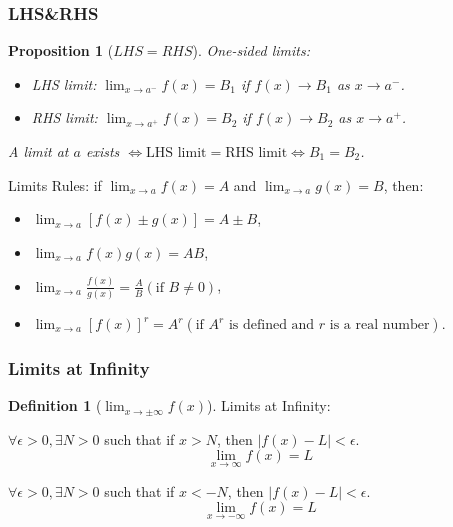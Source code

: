 \documentclass{amsart}
\newtheorem{proposition}[theorem]{Proposition}
\theoremstyle{definition}
\newtheorem{definition}[theorem]{Definition}
\theoremstyle{remark}
\numberwithin{equation}{section}
\begin{document}
\subsubsection{LHS\&RHS}

\begin{proposition}[$LHS=RHS$]
    One-sided limits:
    \begin{itemize}
        \item LHS limit: $\lim_{x \to a^-} f(x)=B_1$ if $f(x) \to B_1$ as $x \to a^-$.
        \item RHS limit: $\lim_{x \to a^+} f(x)=B_2$ if $f(x) \to B_2$ as $x \to a^+$.
    \end{itemize}

    A limit at $a$ exists $\iff \text{LHS limit} = \text{RHS limit} \iff B_1=B_2$.
\end{proposition}

Limits Rules: if $\lim_{x \to a}f(x)=A $ and $\lim_{x \to a}g(x)=B $, then:
\begin{itemize}
    \item $\lim_{x \to a}[f(x) \pm g(x)] = A \pm B $,
    \item $\lim_{x \to a} f(x)g(x) = AB $,
    \item $\lim_{x \to a}\frac{f(x)}{g(x)} = \frac{A}{B} (\text{if } B \neq 0) $,
    \item $\lim_{x \to a} [f(x)]^r = A^r(\text{if $A^r$ is defined and $r$ is a real number})$.
\end{itemize}

\subsubsection{Limits at Infinity}

\begin{definition}[$\lim_{x \to \pm\infty} f(x)$]Limits at Infinity:

    $\forall \epsilon > 0, \exists N > 0$ such that if $x > N$, then $|f(x) - L|< \epsilon$.
    \begin{equation*}
        \lim_{x \to \infty} f(x) = L
    \end{equation*}

    $\forall \epsilon > 0, \exists N > 0$ such that if $x < -N$, then $|f(x) - L|< \epsilon$.
    \begin{equation*}
        \lim_{x \to -\infty} f(x) = L
    \end{equation*}
\end{definition}
\end{document}

